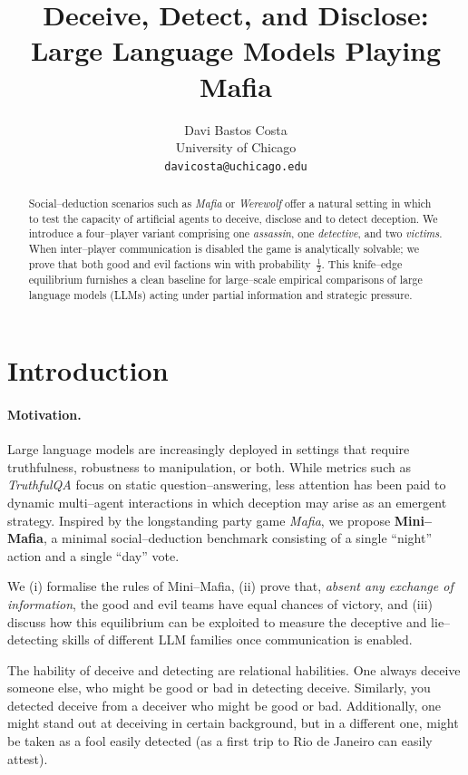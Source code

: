 \documentclass{article}
\title{Deceive, Detect, and Disclose: \\ Large Language Models Playing Mafia}
\author{%
  Davi Bastos Costa \\
  University of Chicago \\
  \texttt{davicosta@uchicago.edu} \\
}
\begin{document}
\maketitle

\begin{abstract}
Social--deduction scenarios such as \emph{Mafia} or \emph{Werewolf} offer a natural setting in which to test the capacity of artificial agents to deceive, disclose and to detect deception.  We introduce a four--player variant comprising one \emph{assassin}, one \emph{detective}, and two \emph{victims}.  When inter--player communication is disabled the game is analytically solvable; we prove that both good and evil factions win with probability~$\tfrac12$.  This knife--edge equilibrium furnishes a clean baseline for large--scale empirical comparisons of large language models (LLMs) acting under partial information and strategic pressure.
\end{abstract}

\section{Introduction}
\paragraph{Motivation.}  Large language models are increasingly deployed in settings that require truthfulness, robustness to manipulation, or both.  While metrics such as \emph{TruthfulQA} focus on static question--answering, less attention has been paid to dynamic multi--agent interactions in which deception may arise as an emergent strategy.  Inspired by the longstanding party game \emph{Mafia}, we propose \textbf{Mini--Mafia}, a minimal social--deduction benchmark consisting of a single ``night'' action and a single ``day'' vote.

We (i) formalise the rules of Mini--Mafia, (ii) prove that, \emph{absent any exchange of information}, the good and evil teams have equal chances of victory, and (iii) discuss how this equilibrium can be exploited to measure the deceptive and lie--detecting skills of different LLM families once communication is enabled.



The hability of deceive and detecting are relational habilities. One always deceive someone else, who might be good or bad in detecting deceive. Similarly, you detected deceive from a deceiver who might be good or bad. Additionally, one might stand out at deceiving in certain background, but in a different one, might be taken as a fool easily detected (as a first trip to Rio de Janeiro can easily attest).
\end{document}
